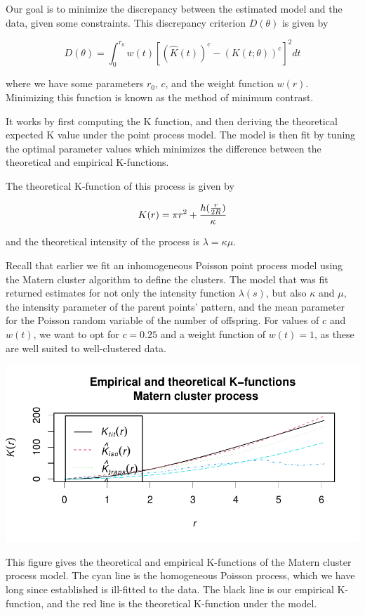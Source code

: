 \documentclass[
  12pt,
]{article}
\begin{document}
Our goal is to minimize the discrepancy between the estimated model and
the data, given some constraints. This discrepancy criterion
\(D(\theta)\) is given by

\[D(\theta) = \int_0^{r_0} w(t)[(\hat K(t))^c - (K(t;\theta))^c]^2 dt\]

where we have some parameters \(r_0\), \(c\), and the weight function
\(w(r)\). Minimizing this function is known as the method of minimum
contrast.

It works by first computing the K function, and then deriving the
theoretical expected K value under the point process model. The model is
then fit by tuning the optimal parameter values which minimizes the
difference between the theoretical and empirical K-functions.

The theoretical K-function of this process is given by

\[K(r) = \pi r^2 + \frac{h\large(\frac{r}{2R}\large)}{\kappa}\]

and the theoretical intensity of the process is
\(\lambda = \kappa \mu\).

Recall that earlier we fit an inhomogeneous Poisson point process model
using the Matern cluster algorithm to define the clusters. The model
that was fit returned estimates for not only the intensity function
\(\lambda(s)\), but also \(\kappa\) and \(\mu\), the intensity parameter
of the parent points' pattern, and the mean parameter for the Poisson
random variable of the number of offspring. For values of \(c\) and
\(w(t)\), we want to opt for \(c=0.25\) and a weight function of
\(w(t) = 1\), as these are well suited to well-clustered data.

\includegraphics{JStevenRaquel_STATS295_Final_files/figure-latex/plot-matern-process-1.pdf}

This figure gives the theoretical and empirical K-functions of the
Matern cluster process model. The cyan line is the homogeneous Poisson
process, which we have long since established is ill-fitted to the data.
The black line is our empirical K-function, and the red line is the
theoretical K-function under the model.
\end{document}
